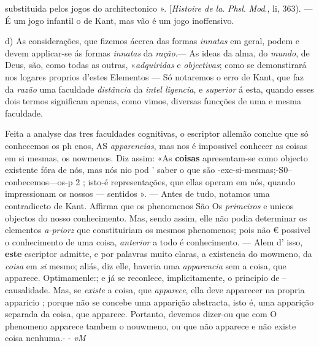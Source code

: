 substituida pelos jogos do architectonico ». [\emph{Histoire de la}. \emph{Phsl}. \emph{Mod}., li, 363). --- É um jogo infantil o de Kant, mas vão é um jogo inoffensivo.

d) As considerações, que fizemos ácerca das formas \emph{innatas} em geral, podem e devem applicar-se ás formas \emph{innatas} da \emph{ração}.--- As ideas da alma, do \emph{mundo}, de Deus, são, como todas as outras, «\emph{adquiridas} e \emph{objectivas}; como se demonstirará nos logares proprios d'estes Elementos --- Só notaremos o erro de Kant, que faz da \emph{razão} uma faculdade \emph{distância} da \emph{intel ligencia}, e \emph{superior} á esta, quando esses dois termos significam apenas, como vimos, diversas funcções de uma e mesma faculdade.

Feita a analyse das tres faculdades cognitivas, o escriptor allemão conclue que só conhecemos os ph enos, AS \emph{apparencias}, mas nos é impossivel conhecer as coisas em si mesmas, os nowmenos. Diz assim: «As \textbf{coisas} apresentam-se como objecto existente fóra de nós, mas nós nio pod ' saber o que são -exc-si-mesmas;-S0--conbecemos---os-p 2 ; isto-é representações, que ellas operam em nós, quando impressionam os nossos --- sentidos ». --- Antes de tudo, notamos uma contradiecto de Kant. Affirma que os phenomenos São Os \emph{primeiros} e unicos objectos do nosso conhecimento. Mas, sendo assim, elle não podia determinar os elementos \emph{a-priorz} que constituiriam os mesmos phenomenos; pois não € possivel o conhecimento de uma coisa, \emph{anterior} a todo é conhecimento. --- Alem d' isso, \textbf{este} escriptor admitte, e por palavras muito claras, a existencia do mowmeno, da \emph{coisa} em \emph{si} mesmo; aliás, diz elle, haveria uma \emph{apparencia} sem a coisa, que apparece. Optimamenle:; e já se reconlece, implicitamente, o principio de --causalidade. Mas, se \emph{existe} a coisa, que \emph{apparece}, ella deve apparecer na propria apparicio ; porque não se concebe uma apparição abstracta, isto é, uma apparição separada da coisa, que apparece. Portanto, devemos dizer-ou que com O phenomeno apparece tambem o nouwmeno, ou que não apparece e não existe coisa nenhuma.- - \emph{vM}

